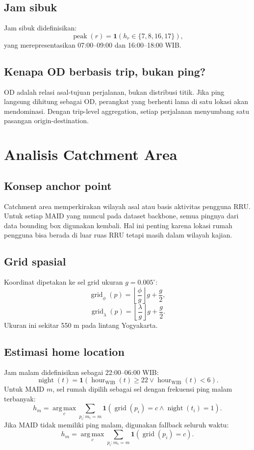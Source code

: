 \documentclass[11pt,a4paper]{article}
\newcommand{\WIB}{\text{WIB}}
\newcommand{\argmax}{\operatorname*{arg\,max}}
\begin{document}
\subsection{Jam sibuk}
Jam sibuk didefinisikan:
\[
\operatorname{peak}(r)=\mathbf{1}\left(h_r\in\{7,8,16,17\}\right),
\]
yang merepresentasikan 07:00--09:00 dan 16:00--18:00 WIB.

\subsection{Kenapa OD berbasis trip, bukan ping?}
OD adalah relasi asal-tujuan perjalanan, bukan distribusi titik. Jika ping langsung dihitung sebagai OD, perangkat yang berhenti lama di satu lokasi akan mendominasi. Dengan trip-level aggregation, setiap perjalanan menyumbang satu pasangan origin-destination.

\section{Analisis Catchment Area}
\subsection{Konsep anchor point}
Catchment area memperkirakan wilayah asal atau basis aktivitas pengguna RRU. Untuk setiap MAID yang muncul pada dataset backbone, semua pingnya dari data bounding box digunakan kembali. Hal ini penting karena lokasi rumah pengguna bisa berada di luar ruas RRU tetapi masih dalam wilayah kajian.

\subsection{Grid spasial}
Koordinat dipetakan ke sel grid ukuran $g=0.005^\circ$:
\[
\operatorname{grid}_{\phi}(p)=\left\lfloor\frac{\phi}{g}\right\rfloor g+\frac{g}{2},
\]
\[
\operatorname{grid}_{\lambda}(p)=\left\lfloor\frac{\lambda}{g}\right\rfloor g+\frac{g}{2}.
\]
Ukuran ini sekitar 550 m pada lintang Yogyakarta.

\subsection{Estimasi home location}
Jam malam didefinisikan sebagai 22:00--06:00 WIB:
\[
\operatorname{night}(t)=\mathbf{1}(\operatorname{hour}_{\WIB}(t)\geq22\lor\operatorname{hour}_{\WIB}(t)<6).
\]
Untuk MAID $m$, sel rumah dipilih sebagai sel dengan frekuensi ping malam terbanyak:
\[
h_m=\argmax_{c}\sum_{p_i:m_i=m}\mathbf{1}(\operatorname{grid}(p_i)=c\land\operatorname{night}(t_i)=1).
\]
Jika MAID tidak memiliki ping malam, digunakan fallback seluruh waktu:
\[
h_m=\argmax_{c}\sum_{p_i:m_i=m}\mathbf{1}(\operatorname{grid}(p_i)=c).
\]
\end{document}
